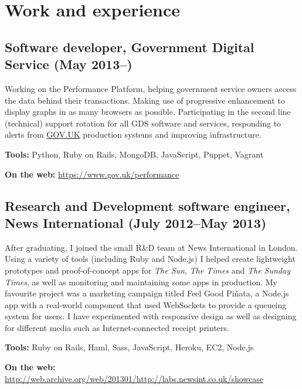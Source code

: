 \documentclass[10pt,a4paper]{article}
\renewenvironment{itemize}{
  \begin{list}{}{
    \setlength{\leftmargin}{1em}
    \setlength{\itemsep}{0em}
    \setlength{\parskip}{0pt}
    \setlength{\parsep}{0.2em}
  }
}{
  \end{list}
}
\begin{document}
\section*{Work and experience}

\subsection*{Software developer, Government Digital Service (May 2013--)}

Working on the Performance Platform, helping government service owners access
the data behind their transactions. Making use of progressive enhancement to
display graphs in as many browsers as possible. Participating in the second
line (technical) support rotation for all GDS software and services,
responding to alerts from \href{https://www.gov.uk/}{GOV.UK} production
systems and improving infrastructure.

\begin{itemize}
  \item \textbf{Tools:} Python, Ruby on Rails, MongoDB, JavaScript, Puppet, Vagrant
  \item \textbf{On the web:} \url{https://www.gov.uk/performance}
\end{itemize}

\subsection*{Research and Development software engineer, News International (July 2012--May 2013)}

After graduating, I joined the small R\&D team at News International in
London. Using a variety of tools (including Ruby and Node.js) I helped create
lightweight prototypes and proof-of-concept apps for \emph{The Sun}, \emph{The
Times} and \emph{The Sunday Times}, as well as monitoring and maintaining some
apps in production. My favourite project was a marketing campaign titled Feel
Good Piñata, a Node.js app with a real-world component that used WebSockets to
provide a queueing system for users. I have experimented with responsive
design as well as designing for different media such as Internet-connected
receipt printers.

\begin{itemize}
  \item \textbf{Tools:} Ruby on Rails, Haml, Sass, JavaScript, Heroku, EC2, Node.js
  \item \textbf{On the web:} \url{http://web.archive.org/web/201301/http://labs.newsint.co.uk/showcase}
\end{itemize}
\end{document}
